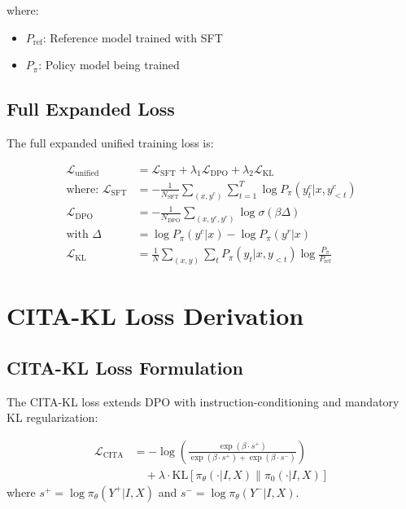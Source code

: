 where:
\begin{itemize}[leftmargin=*,itemsep=1pt]
    \item $P_{\text{ref}}$: Reference model trained with SFT
    \item $P_\pi$: Policy model being trained
\end{itemize}

\subsection{Full Expanded Loss}

The full expanded unified training loss is:

\begin{align}
\mathcal{L}_{\text{unified}} &= \mathcal{L}_{\text{SFT}} + \lambda_1 \mathcal{L}_{\text{DPO}} + \lambda_2 \mathcal{L}_{\text{KL}} \nonumber \\[3pt]
\text{where: } \mathcal{L}_{\text{SFT}} &= -\frac{1}{N_{\text{SFT}}} \sum_{(x, y^{c})} \sum_{t=1}^{T} \log P_\pi(y_t^{c}|x, y_{<t}^{c}) \nonumber \\[3pt]
\mathcal{L}_{\text{DPO}} &= -\frac{1}{N_{\text{DPO}}} \sum_{(x, y^{c}, y^{r})} \log \sigma(\beta \Delta) \nonumber \\
\text{with } \Delta &= \log P_\pi(y^{c}|x) - \log P_\pi(y^{r}|x) \nonumber \\[3pt]
\mathcal{L}_{\text{KL}} &= \frac{1}{N} \sum_{(x,y)} \sum_{t} P_\pi(y_t|x, y_{<t}) \log \frac{P_\pi}{P_{\text{ref}}}
\label{eq:full_expanded}
\end{align}

\section{CITA-KL Loss Derivation}
\label{sec:appendix_cita_kl}

\subsection{CITA-KL Loss Formulation}

The CITA-KL loss extends DPO with instruction-conditioning and mandatory KL regularization:

\begin{align}
\mathcal{L}_{\text{CITA}} &= -\log\left(\frac{\exp(\beta \cdot s^+)}{\exp(\beta \cdot s^+) + \exp(\beta \cdot s^-)}\right) \nonumber \\
&\quad + \lambda \cdot \text{KL}[\pi_\theta(\cdot | I, X) \| \pi_0(\cdot | I, X)]
\label{eq:cita_kl_full}
\end{align}
where $s^+ = \log \pi_\theta(Y^+ | I, X)$ and $s^- = \log \pi_\theta(Y^- | I, X)$.

